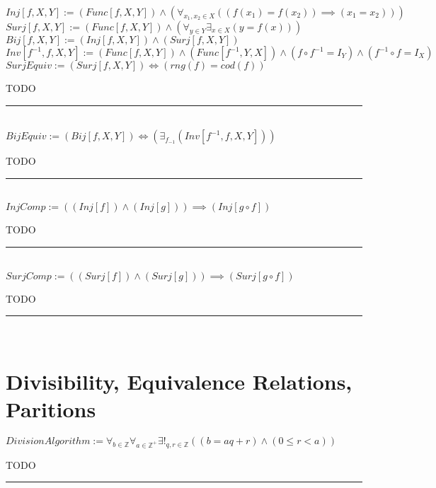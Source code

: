 \documentclass{book}
\newcommand{\abr}{:=}
\begin{document}
$Inj[f, X, Y] \abr (Func[f, X, Y]) \land (\forall_{x_1, x_2 \in X}((f(x_1) = f(x_2)) \implies (x_1 = x_2)))$ \\%
$Surj[f, X, Y] \abr (Func[f, X, Y]) \land (\forall_{y \in Y} \exists_{x \in X}(y = f(x)))$ \\%
$Bij[f, X, Y] \abr (Inj[f, X, Y]) \land (Surj[f, X, Y])$ \\%
$Inv[f^{-1}, f, X, Y] \abr (Func[f, X, Y]) \land (Func[f^{-1}, Y, X]) \land (f \circ f^{-1} = I_Y) \land (f^{-1} \circ f = I_X)$ \\

$SurjEquiv \abr (Surj[f, X, Y]) \iff (rng(f) = cod(f))$ \\
\begin{enumerate}
  \lit TODO
\end{enumerate} \vspace{.75mm} \hrule \vspace{.75mm} \ \\

$BijEquiv \abr (Bij[f, X, Y]) \iff (\exists_{f_{-1}}(Inv[f^{-1}, f, X, Y]))$ \\
\begin{enumerate}
  \lit TODO
\end{enumerate} \vspace{.75mm} \hrule \vspace{.75mm} \ \\

$InjComp \abr ((Inj[f]) \land (Inj[g])) \implies (Inj[g \circ f])$
\begin{enumerate}
  \lit TODO
\end{enumerate} \vspace{.75mm} \hrule \vspace{.75mm} \ \\

$SurjComp \abr ((Surj[f]) \land (Surj[g])) \implies (Surj[g \circ f])$
\begin{enumerate}
  \lit TODO
\end{enumerate} \vspace{.75mm} \hrule \vspace{.75mm} \ \\


\section{Divisibility, Equivalence Relations, Paritions}
$DivisionAlgorithm \abr \forall_{b \in \mathbb{Z}} \forall_{a \in \mathbb{Z}^+} \exists!_{q, r \in \mathbb{Z}}((b = a q + r) \land (0 \leq r < a))$
\begin{enumerate}
  \lit TODO
\end{enumerate} \vspace{.75mm} \hrule \vspace{.75mm} \ \\
\end{document}
